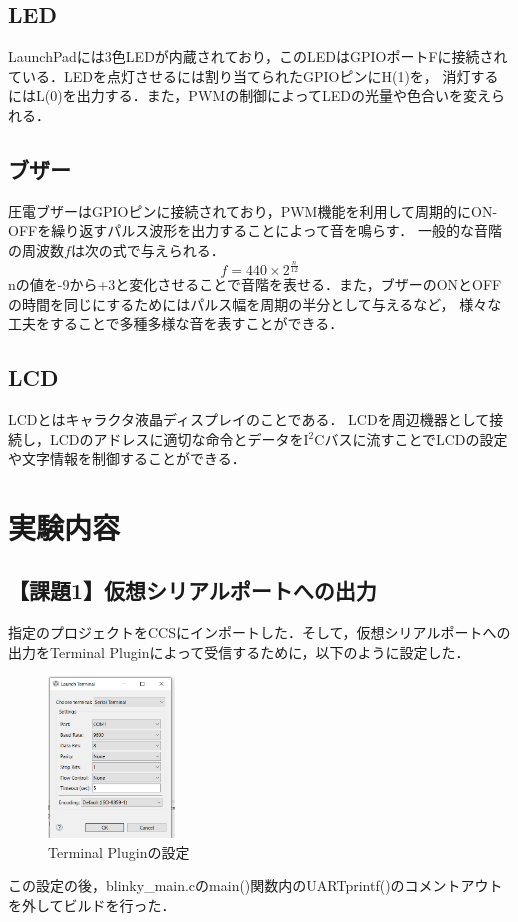 \documentclass{jlreq}
\begin{document}
\subsection{LED}
LaunchPadには3色LEDが内蔵されており，このLEDはGPIOポートFに接続されている．LEDを点灯させるには割り当てられたGPIOピンにH(1)を，
消灯するにはL(0)を出力する．また，PWMの制御によってLEDの光量や色合いを変えられる．

\subsection{ブザー}
圧電ブザーはGPIOピンに接続されており，PWM機能を利用して周期的にON-OFFを繰り返すパルス波形を出力することによって音を鳴らす．
一般的な音階の周波数$f$は次の式で与えられる．
\begin{equation}
    f=440\times2^{\frac{n}{12}}
\end{equation}
nの値を-9から+3と変化させることで音階を表せる．また，ブザーのONとOFFの時間を同じにするためにはパルス幅を周期の半分として与えるなど，
様々な工夫をすることで多種多様な音を表すことができる．

\subsection{LCD}
LCDとはキャラクタ液晶ディスプレイのことである．
LCDを周辺機器として接続し，LCDのアドレスに適切な命令とデータをI$^2$Cバスに流すことでLCDの設定や文字情報を制御することができる．

\section{実験内容}

\subsection{【課題1】仮想シリアルポートへの出力}
指定のプロジェクトをCCSにインポートした．そして，仮想シリアルポートへの出力をTerminal Pluginによって受信するために，以下のように設定した．
\begin{figure}
    \centering
    \includegraphics[width=0.3\textwidth]{setting_virtual_serial_port.png}
    \caption{Terminal Pluginの設定}
    \label{fig:Terminal_Plugin}
\end{figure}
この設定の後，blinky\_main.cのmain()関数内のUARTprintf()のコメントアウトを外してビルドを行った．
\end{document}
